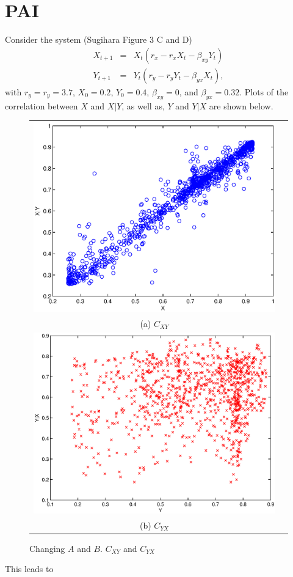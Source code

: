 \documentclass[a4paper,11pt]{article}
\begin{document}
\section{PAI}
Consider the system (Sugihara Figure 3 C and D)
\begin{eqnarray}
X_{t+1} &=& X_t\left(r_x-r_xX_t-\beta_{xy}Y_t\right)\\
Y_{t+1} &=& Y_t\left(r_y-r_yY_t-\beta_{yx}X_t\right),
\end{eqnarray}
with $r_y=r_y=3.7$, $X_0 = 0.2$, $Y_0=0.4$, $\beta_{xy}=0$, and $\beta_{yx}=0.32$.  Plots of the correlation between $X$ and $X|Y$, as well as, $Y$ and $Y|X$ are shown below.
\begin{center}
\begin{figure}[H]
\begin{tabular}{cc}
\includegraphics[scale=0.5]{RLCircuitPlots/SugFig3_XgY.eps} \\
(a) $C_{XY}$ \\[6pt]
\includegraphics[scale=0.5]{RLCircuitPlots/SugFig3_YgX.eps} \\
(b) $C_{YX}$ \\[6pt]
\end{tabular}
\caption{Changing $A$ and $B$.  $C_{XY}$ and $C_{YX}$}
\label{fig1}
\end{figure}
\end{center}
This leads to
\end{document}
